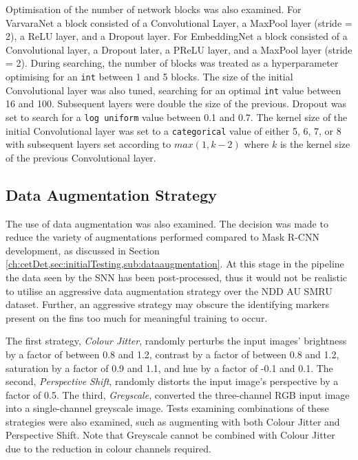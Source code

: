 Optimisation of the number of network blocks was also examined. For VarvaraNet a block consisted of a Convolutional Layer, a MaxPool layer (stride = 2), a ReLU layer, and a Dropout layer. For EmbeddingNet a block consisted of a Convolutional layer, a Dropout later, a PReLU layer, and a MaxPool layer (stride = 2). During searching, the number of blocks was treated as a hyperparameter optimising for an \texttt{int} between 1 and 5 blocks. The size of the initial Convolutional layer was also tuned, searching for an optimal \texttt{int} value between 16 and 100. Subsequent layers were double the size of the previous. Dropout was set to search for a \texttt{log uniform} value between 0.1 and 0.7. The kernel size of the initial Convolutional layer was set to a \texttt{categorical} value of either 5, 6, 7, or 8 with subsequent layers set according to $max(1, k - 2)$ where $k$ is the kernel size of the previous Convolutional layer.

\subsection{Data Augmentation Strategy}\label{ch:ID,sec:SNNDevelopment,sub:DataAugmentation}

The use of data augmentation was also examined. The decision was made to reduce the variety of augmentations performed compared to Mask R-CNN development, as discussed in Section \ref{ch:cetDet,sec:initialTesting,sub:dataaugmentation}. At this stage in the pipeline the data seen by the SNN has been post-processed, thus it would not be realistic to utilise an aggressive data augmentation strategy over the NDD AU SMRU dataset. Further, an aggressive strategy may obscure the identifying markers present on the fins too much for meaningful training to occur. 

The first strategy, \textit{Colour Jitter}, randomly perturbs the input images' brightness by a factor of between 0.8 and 1.2, contrast by a factor of between 0.8 and 1.2, saturation by a factor of 0.9 and 1.1, and hue by a factor of -0.1 and 0.1. The second, \textit{Perspective Shift}, randomly distorts the input image's perspective by a factor of 0.5. The third, \textit{Greyscale}, converted the three-channel RGB input image into a single-channel greyscale image. Tests examining combinations of these strategies were also examined, such as augmenting with both Colour Jitter and Perspective Shift. Note that Greyscale cannot be combined with Colour Jitter due to the reduction in colour channels required. 

